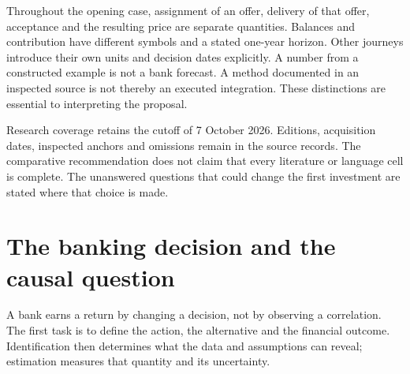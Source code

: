 Throughout the opening case, assignment of an offer, delivery of that offer,
acceptance and the resulting price are separate quantities. Balances and
contribution have different symbols and a stated one-year horizon. Other
journeys introduce their own units and decision dates explicitly. A number
from a constructed example is not a bank forecast. A method documented in an
inspected source is not thereby an executed integration. These distinctions
are essential to interpreting the proposal.

Research coverage retains the cutoff of 7 October 2026. Editions, acquisition
dates, inspected anchors and omissions remain in the source records. The
comparative recommendation does not claim that every literature or language
cell is complete. The unanswered questions that could change the first
investment are stated where that choice is made.



\begingroup\setlength{\parskip}{0pt}\tableofcontents\endgroup
\mainmatter
\part{The banking decision and the causal question}
\label{reading:part-decision}
A bank earns a return by changing a decision, not by observing a correlation.
The first task is to define the action, the alternative and the financial outcome.
Identification then determines what the data and assumptions can reveal;
estimation measures that quantity and its uncertainty.


